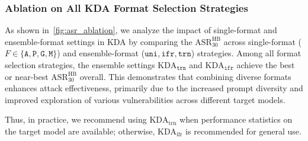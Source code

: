 




\subsubsection{Ablation on All KDA Format Selection Strategies} 





As shown in~\autoref{fig:asr_ablation}, we analyze the impact of single-format and ensemble-format settings in KDA by comparing the $\text{ASR}^{\text{HB}}_{30}$ across single-format ($F\in\{\texttt{A}, \texttt{P},\texttt{G}, \texttt{M}\}$) and ensemble-format ($\texttt{uni}, \texttt{ifr}, \texttt{trn}$) strategies. Among all format selection strategies, the ensemble settings $\text{KDA}_{\texttt{trn}}$ and $\text{KDA}_{\texttt{ifr}}$ achieve the best or near-best $\text{ASR}^{\text{HB}}_{30}$ overall. This demonstrates that combining diverse formats enhances attack effectiveness, primarily due to the increased prompt diversity and improved exploration of various vulnerabilities across different target models. 

Thus, in practice, we recommend using $\text{KDA}_{\text{trn}}$ when performance statistics on the target model are available; otherwise, $\text{KDA}_{\text{ifr}}$ is recommended for general use.







